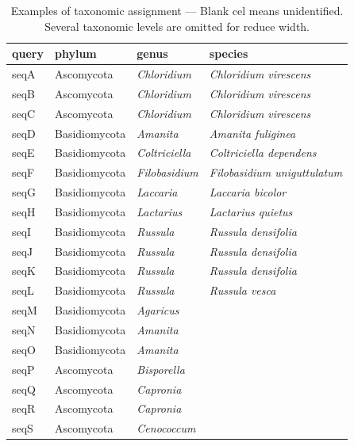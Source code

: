 \documentclass[titlepage,10pt,a4paper,english]{jsbook}
\begin{document}
\begin{table}[h]
\begin{center}
\footnotesize\setlength{\baselineskip}{0.9em}%
\begin{tabular}{l|lll} 
query & phylum & genus & species \\\hline\hline
seqA & Ascomycota & \textit{Chloridium} & \textit{Chloridium virescens} \\
seqB & Ascomycota & \textit{Chloridium} & \textit{Chloridium virescens} \\
seqC & Ascomycota & \textit{Chloridium} & \textit{Chloridium virescens} \\
seqD & Basidiomycota & \textit{Amanita} & \textit{Amanita fuliginea} \\
seqE & Basidiomycota & \textit{Coltriciella} & \textit{Coltriciella dependens} \\
seqF & Basidiomycota & \textit{Filobasidium} & \textit{Filobasidium uniguttulatum} \\
seqG & Basidiomycota & \textit{Laccaria} & \textit{Laccaria bicolor} \\
seqH & Basidiomycota & \textit{Lactarius} & \textit{Lactarius quietus} \\
seqI & Basidiomycota & \textit{Russula} & \textit{Russula densifolia} \\
seqJ & Basidiomycota & \textit{Russula} & \textit{Russula densifolia} \\
seqK & Basidiomycota & \textit{Russula} & \textit{Russula densifolia} \\
seqL & Basidiomycota & \textit{Russula} & \textit{Russula vesca} \\
seqM & Basidiomycota & \textit{Agaricus} &  \\
seqN & Basidiomycota & \textit{Amanita} &  \\
seqO & Basidiomycota & \textit{Amanita} &  \\
seqP & Ascomycota & \textit{Bisporella} &  \\
seqQ & Ascomycota & \textit{Capronia} &  \\
seqR & Ascomycota & \textit{Capronia} &  \\
seqS & Ascomycota & \textit{Cenococcum} &  \\
\end{tabular}
\end{center}
\caption{Examples of taxonomic assignment --- Blank cel means unidentified. Several taxonomic levels are omitted for reduce width.}
\label{table:exampleresultsofidentification}
\end{table}
\end{document}
